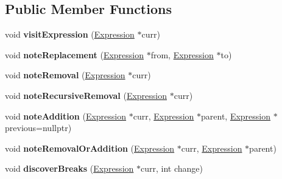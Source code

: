 \subsection*{Public Member Functions}
\begin{DoxyCompactItemize}
\item 
\mbox{\label{structwasm_1_1_type_updater_a18996e75a8a1428e4c56c9dfead5a740}} 
void {\bfseries visit\+Expression} (\mbox{\hyperlink{classwasm_1_1_expression}{Expression}} $\ast$curr)
\item 
\mbox{\label{structwasm_1_1_type_updater_ac5cab5c3f8948bb39cc69b33b6059593}} 
void {\bfseries note\+Replacement} (\mbox{\hyperlink{classwasm_1_1_expression}{Expression}} $\ast$from, \mbox{\hyperlink{classwasm_1_1_expression}{Expression}} $\ast$to)
\item 
\mbox{\label{structwasm_1_1_type_updater_a35aecaba062192f5e4cce0bcafe98b55}} 
void {\bfseries note\+Removal} (\mbox{\hyperlink{classwasm_1_1_expression}{Expression}} $\ast$curr)
\item 
\mbox{\label{structwasm_1_1_type_updater_a092b80f1c9fa492a93fb7c960c45bd1b}} 
void {\bfseries note\+Recursive\+Removal} (\mbox{\hyperlink{classwasm_1_1_expression}{Expression}} $\ast$curr)
\item 
\mbox{\label{structwasm_1_1_type_updater_a5ac98f7699367b6f4cc67381f3c9fd17}} 
void {\bfseries note\+Addition} (\mbox{\hyperlink{classwasm_1_1_expression}{Expression}} $\ast$curr, \mbox{\hyperlink{classwasm_1_1_expression}{Expression}} $\ast$parent, \mbox{\hyperlink{classwasm_1_1_expression}{Expression}} $\ast$previous=nullptr)
\item 
\mbox{\label{structwasm_1_1_type_updater_a3c84e09a34e7aed079fd65e908a2c848}} 
void {\bfseries note\+Removal\+Or\+Addition} (\mbox{\hyperlink{classwasm_1_1_expression}{Expression}} $\ast$curr, \mbox{\hyperlink{classwasm_1_1_expression}{Expression}} $\ast$parent)
\item 
\mbox{\label{structwasm_1_1_type_updater_a739f87bdabfae81320eef41041fb6068}} 
void {\bfseries discover\+Breaks} (\mbox{\hyperlink{classwasm_1_1_expression}{Expression}} $\ast$curr, int change)

\end{DoxyCompactItemize}
